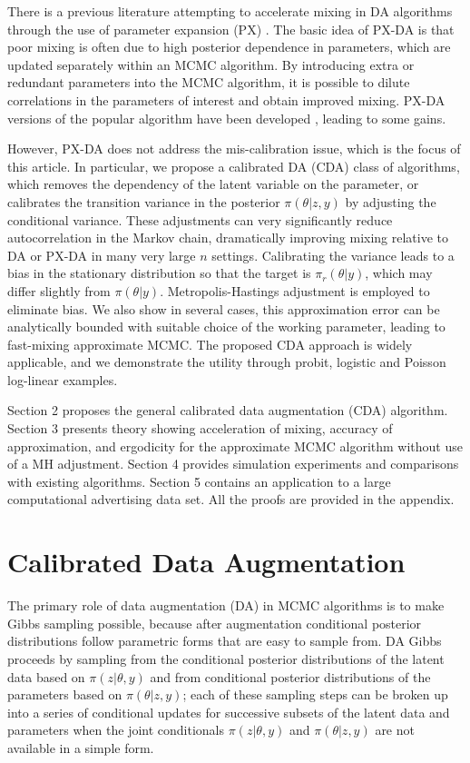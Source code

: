 \documentclass[10pt]{article}
\begin{document}
There is a previous literature attempting to accelerate mixing in DA algorithms through the use of parameter expansion (PX) \citep{liu1999parameter}.  The basic idea of PX-DA is that poor mixing is often due to high posterior dependence in parameters, which are updated separately within an MCMC algorithm.  By introducing extra or redundant parameters into the MCMC algorithm, it is possible to dilute correlations in the parameters of interest and obtain improved mixing.  PX-DA versions of the popular \cite{albert1993bayesian} algorithm have been developed \citep{liu1999parameter}, leading to some gains.  

However, PX-DA does not address the mis-calibration issue, which is the focus of this article.  In particular, we propose a calibrated DA (CDA) class of algorithms, which {\color{red} removes the dependency of the latent variable on the parameter, or} calibrates the transition variance in the posterior $\pi( \theta | z, y)$ by adjusting the conditional variance.  These adjustments can very significantly reduce autocorrelation in the Markov chain, dramatically improving mixing relative to DA or PX-DA in many very large $n$ settings. Calibrating the variance leads to a bias in the stationary distribution so that the target is $\pi_r( \theta | y)$, which may differ slightly from $\pi( \theta | y)$.  Metropolis-Hastings adjustment is employed to eliminate bias. We also show in several cases, this approximation error can be analytically bounded with suitable choice of the working parameter, leading to fast-mixing approximate MCMC. The proposed CDA approach is widely applicable, and we demonstrate the utility through probit, logistic and Poisson log-linear examples.


Section 2 proposes the general calibrated data augmentation (CDA) algorithm. Section 3 presents theory showing acceleration of mixing, accuracy of approximation, and ergodicity for the approximate MCMC algorithm without use of a MH adjustment.  Section 4 provides simulation experiments and comparisons with existing algorithms.  Section 5 contains an application to a large computational advertising data set. All the proofs are provided in the appendix. %

\section{Calibrated Data Augmentation}

The primary role of data augmentation (DA) in MCMC algorithms is to make Gibbs sampling possible, because after augmentation conditional posterior distributions follow parametric forms that are easy to sample from.  DA Gibbs proceeds by sampling from the conditional posterior distributions of the latent data based on $\pi(z| \theta,y)$ and from conditional posterior distributions of the parameters based on $\pi(\theta | z,y)$; each of these sampling steps can be broken up into a series of conditional updates for successive subsets of the latent data and parameters when the joint conditionals $\pi(z|\theta,y)$ and $\pi(\theta | z, y)$ are not available in a simple form.
\end{document}
